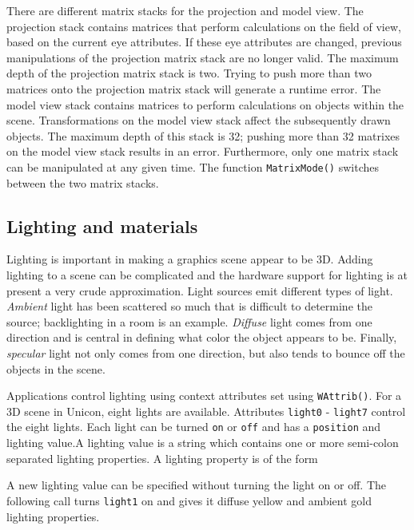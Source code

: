 There are different matrix stacks for the projection and model
view. The projection stack contains matrices that perform calculations
on the field of view, based on the current eye attributes. If these
eye attributes are changed, previous manipulations of the projection
matrix stack are no longer valid. The maximum depth of the projection
matrix stack is two. Trying to push more than two matrices onto the
projection matrix stack will generate a runtime error. The model view
stack contains matrices to perform calculations on objects within the
scene. Transformations on the model view stack affect the subsequently
drawn objects. The maximum depth of this stack is 32; pushing more
than 32 matrixes on the model view stack results in an
error. Furthermore, only one matrix stack can be manipulated at any
given time. The function \texttt{MatrixMode()} switches between the
two matrix stacks.

\subsection*{Lighting and materials}

Lighting is important in making a graphics scene appear to be 3D.
Adding lighting to a scene can be complicated and the hardware support
for lighting is at present a very crude approximation. Light sources
emit different types of light. \emph{Ambient} light has been scattered
so much that is difficult to determine the source; backlighting in a
room is an example. \emph{Diffuse} light comes from one direction and
is central in defining what color the object appears to be. Finally,
\emph{specular} light not only comes from one direction, but also
tends to bounce off the objects in the scene.

Applications control lighting using context attributes set using
\texttt{WAttrib()}. For a 3D scene in Unicon, eight lights are
available. Attributes \texttt{light0} - \texttt{light7} control the
eight lights. Each light can be turned \texttt{on} or \texttt{off}
and has a \texttt{position} and lighting value.A lighting value is a
string which contains one or more semi-colon separated lighting
properties. A lighting property is of the form


\noindent
A new lighting value can be specified without turning the light on or off.
The following call turns \texttt{light1} on and gives it diffuse
yellow and ambient gold lighting properties. 

